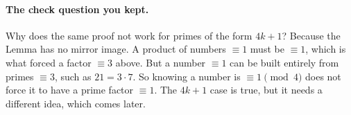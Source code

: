 \documentclass[11pt]{article}
\begin{document}
\paragraph{The check question you kept.} Why does the same proof not work for primes of the form $4k + 1$? Because the Lemma has no mirror image. A product of numbers $\equiv 1$ must be $\equiv 1$, which is what forced a factor $\equiv 3$ above. But a number $\equiv 1$ can be built entirely from primes $\equiv 3$, such as $21 = 3 \cdot 7$. So knowing a number is $\equiv 1 \pmod 4$ does not force it to have a prime factor $\equiv 1$. The $4k+1$ case is true, but it needs a different idea, which comes later.
\end{document}
